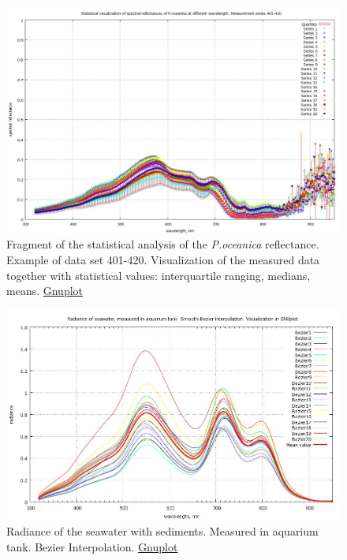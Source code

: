 \documentclass[11pt]{article}
\begin{document}
\begin{appendices}
\begin{figure}[h]
	\begin{center}
	\includegraphics[scale=0.20]{GNU-Stat-M-401-420.jpg}
	\caption{Fragment of the statistical analysis of the \textit{P.oceanica} reflectance. Example of data set 401-420. 
		Visualization of the measured data together with statistical values: interquartile ranging, medians, means. \href{http://www.gnuplot.info/}{Gnuplot}}
	\label{fig:A.15}
	\end{center}
\end{figure}

\begin{figure}[H]
	\centering
	\includegraphics[scale=0.25]{GNU-Radiance_Bezier.jpg}
	\caption{Radiance of the seawater with sediments. Measured in aquarium tank. Bezier Interpolation. \href{http://www.gnuplot.info/}{Gnuplot}}
	\label{fig:A.16}
\end{figure}


\end{appendices}
\end{document}

